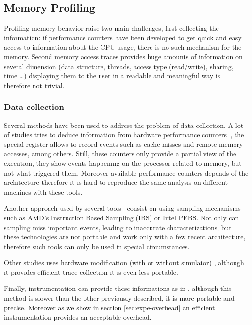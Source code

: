 \subsection{Memory Profiling}
\label{sec:soa-profiling}

Profiling memory behavior raise two main challenges, first collecting the
information: if performance counters have been developed to get quick and
easy access to information about the CPU usage, there is no such mechanism for
the memory. Second memory access traces provides huge amounts of information
on several dimension (data structure, threads, access type (read/write),
sharing, time \ldots) displaying them to the user in a readable and meaningful
way is therefore not trivial.

\subsubsection{Data collection}

Several methods have been used to address the problem of data collection. A
lot of studies tries to deduce information from hardware performance
counters~\cite{Majo13(Mis)understanding,
Jiang14Understanding,Bosch00Rivet,Weyers14Visualization,Tao01Visualizing,DeRose01Hardware},
the special register allows to record events such as cache misses and remote
memory accesses, among others. Still, these counters only provide a partial
view of the execution, they show events happening on the processor related to
memory, but not what triggered them. Moreover available performance counters
depends of the architecture therefore it is hard to reproduce the same
analysis on different machines with these tools.


Another approach used by several
tools~\cite{Lachaize12MemProf,McCurdy2010,Liu14Tool,Gimenez14Dissecting}
consist on  using sampling mechanisms such as AMD's Instruction Based Sampling
(IBS) or Intel PEBS. Not only can sampling miss important events, leading to
inaccurate characterizations, but these technologies are not portable and work
only with a few recent architecture, therefore such tools can only be used in
special circumstances.

Other studies uses hardware modification (with or without simulator)
\cite{Bao08HMTT,Martonosi92MemSpy}, although it provides efficient trace
collection it is even less portable.


Finally, instrumentation can provide these informations as in
\cite{DeRose02SIGMA,Rozar14Amelioration}, although this method is slower than
the other previously described, it is more portable and precise. Moreover as
we show in section \ref{sec:expe-overhead} an efficient instrumentation
provides an acceptable overhead.

